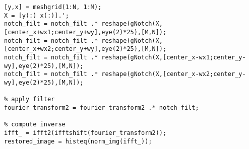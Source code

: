 \documentclass{article}
\begin{document}
\begin{enumerate}
\begin{enumerate}
\begin{lstlisting}
[y,x] = meshgrid(1:N, 1:M);
X = [y(:) x(:)].';
notch_filt = notch_filt .* reshape(gNotch(X,[center_x+wx1;center_y+wy],eye(2)*25),[M,N]);
notch_filt = notch_filt .* reshape(gNotch(X,[center_x+wx2;center_y+wy],eye(2)*25),[M,N]);
notch_filt = notch_filt .* reshape(gNotch(X,[center_x-wx1;center_y-wy],eye(2)*25),[M,N]);
notch_filt = notch_filt .* reshape(gNotch(X,[center_x-wx2;center_y-wy],eye(2)*25),[M,N]);

% apply filter
fourier_transform2 = fourier_transform2 .* notch_filt;

% compute inverse
ifft_ = ifft2(ifftshift(fourier_transform2));
restored_image = histeq(norm_img(ifft_));
\end{lstlisting}

\end{enumerate}

\end{enumerate}
\end{document}

